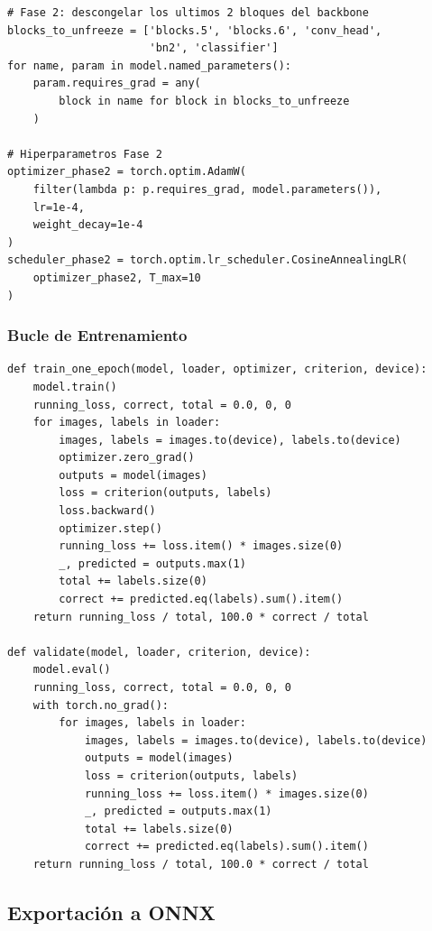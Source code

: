 \documentclass[12pt,a4paper]{article}
\begin{document}
\begin{lstlisting}[caption={Configuración de Fase 2: fine-tuning parcial}, label={lst:phase2}]
# Fase 2: descongelar los ultimos 2 bloques del backbone
blocks_to_unfreeze = ['blocks.5', 'blocks.6', 'conv_head',
                      'bn2', 'classifier']
for name, param in model.named_parameters():
    param.requires_grad = any(
        block in name for block in blocks_to_unfreeze
    )

# Hiperparametros Fase 2
optimizer_phase2 = torch.optim.AdamW(
    filter(lambda p: p.requires_grad, model.parameters()),
    lr=1e-4,
    weight_decay=1e-4
)
scheduler_phase2 = torch.optim.lr_scheduler.CosineAnnealingLR(
    optimizer_phase2, T_max=10
)
\end{lstlisting}

\subsubsection{Bucle de Entrenamiento}

\begin{lstlisting}[caption={Bucle de entrenamiento principal}, label={lst:trainloop}]
def train_one_epoch(model, loader, optimizer, criterion, device):
    model.train()
    running_loss, correct, total = 0.0, 0, 0
    for images, labels in loader:
        images, labels = images.to(device), labels.to(device)
        optimizer.zero_grad()
        outputs = model(images)
        loss = criterion(outputs, labels)
        loss.backward()
        optimizer.step()
        running_loss += loss.item() * images.size(0)
        _, predicted = outputs.max(1)
        total += labels.size(0)
        correct += predicted.eq(labels).sum().item()
    return running_loss / total, 100.0 * correct / total

def validate(model, loader, criterion, device):
    model.eval()
    running_loss, correct, total = 0.0, 0, 0
    with torch.no_grad():
        for images, labels in loader:
            images, labels = images.to(device), labels.to(device)
            outputs = model(images)
            loss = criterion(outputs, labels)
            running_loss += loss.item() * images.size(0)
            _, predicted = outputs.max(1)
            total += labels.size(0)
            correct += predicted.eq(labels).sum().item()
    return running_loss / total, 100.0 * correct / total
\end{lstlisting}

\subsection{Exportación a ONNX}
\end{document}
